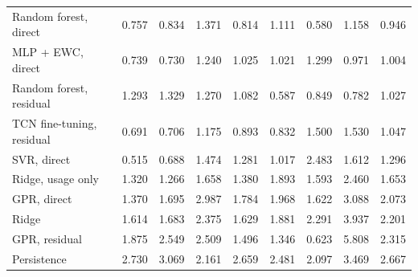 \begin{table}[t]
\begin{tabular}{lrrrrrrrr}
    Random forest, direct & 0.757 & 0.834 & 1.371 & 0.814 & 1.111 & 0.580 & 1.158 & 0.946 \\
    MLP + EWC, direct & 0.739 & 0.730 & 1.240 & 1.025 & 1.021 & 1.299 & 0.971 & 1.004 \\
    Random forest, residual & 1.293 & 1.329 & 1.270 & 1.082 & 0.587 & 0.849 & 0.782 & 1.027 \\
    TCN fine-tuning, residual & 0.691 & 0.706 & 1.175 & 0.893 & 0.832 & 1.500 & 1.530 & 1.047 \\
    SVR, direct & 0.515 & 0.688 & 1.474 & 1.281 & 1.017 & 2.483 & 1.612 & 1.296 \\
    Ridge, usage only & 1.320 & 1.266 & 1.658 & 1.380 & 1.893 & 1.593 & 2.460 & 1.653 \\
    GPR, direct & 1.370 & 1.695 & 2.987 & 1.784 & 1.968 & 1.622 & 3.088 & 2.073 \\
    Ridge & 1.614 & 1.683 & 2.375 & 1.629 & 1.881 & 2.291 & 3.937 & 2.201 \\
    GPR, residual & 1.875 & 2.549 & 2.509 & 1.496 & 1.346 & 0.623 & 5.808 & 2.315 \\
    Persistence & 2.730 & 3.069 & 2.161 & 2.659 & 2.481 & 2.097 & 3.469 & 2.667 \\
    \bottomrule
  \end{tabular}
\end{table}
